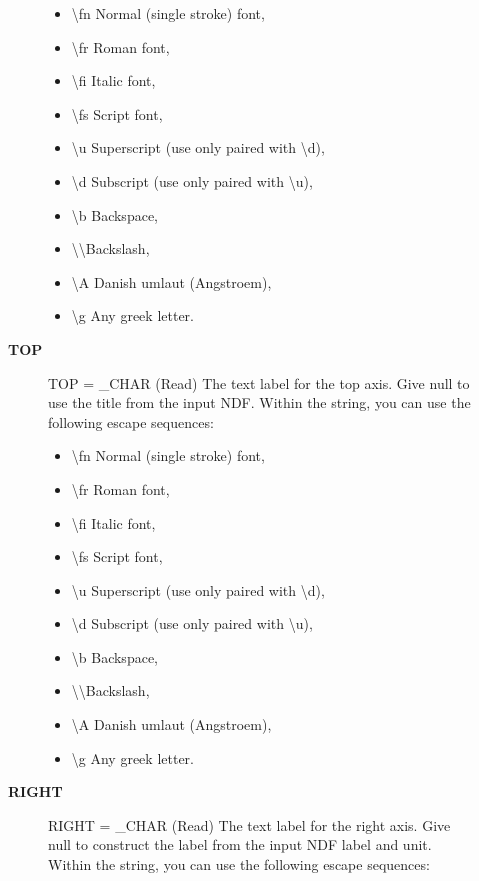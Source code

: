 \begin{description}
\begin{description}
\begin{itemize}
   \item  \textbackslash fn Normal (single stroke) font,
   \item  \textbackslash fr Roman font,
   \item  \textbackslash fi Italic font,
   \item  \textbackslash fs Script font,
   \item  \textbackslash u  Superscript (use only paired with \textbackslash d),
   \item  \textbackslash d  Subscript (use only paired with \textbackslash u),
   \item  \textbackslash b  Backspace,
   \item  \textbackslash \textbackslash   Backslash,
   \item  \textbackslash A  Danish umlaut (Angstroem),
   \item  \textbackslash g  Any greek letter.
\end{itemize}
\item [\textbf{TOP}]
TOP = \_CHAR (Read)
   The text label for the top axis. Give null to use the title from
   the input NDF. Within the string, you can use the following
   escape sequences:
\begin{itemize}
   \item  \textbackslash fn Normal (single stroke) font,
   \item  \textbackslash fr Roman font,
   \item  \textbackslash fi Italic font,
   \item  \textbackslash fs Script font,
   \item  \textbackslash u  Superscript (use only paired with \textbackslash d),
   \item  \textbackslash d  Subscript (use only paired with \textbackslash u),
   \item  \textbackslash b  Backspace,
   \item  \textbackslash \textbackslash   Backslash,
   \item  \textbackslash A  Danish umlaut (Angstroem),
   \item  \textbackslash g  Any greek letter.
\end{itemize}
\item [\textbf{RIGHT}]
RIGHT = \_CHAR (Read)
   The text label for the right axis. Give null to construct the
   label from the input NDF label and unit. Within the string,
   you can use the following escape sequences:
\begin{itemize}

\end{itemize}
\end{description}
\end{description}
